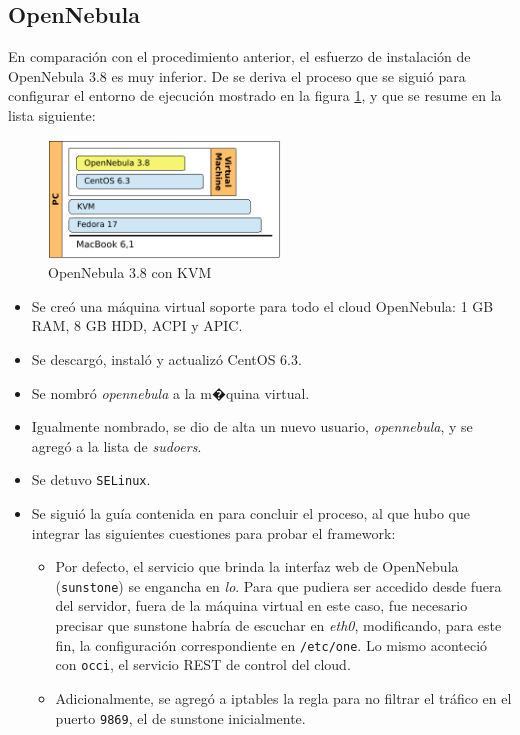 \subsection{OpenNebula}\label{subsec:opennebula}
\noindent En comparaci\'on con el procedimiento anterior, el esfuerzo de instalaci\'on de OpenNebula 3.8 es muy inferior. De \cite{centosonquickstart} se deriva el proceso que se sigui\'o para configurar el entorno de ejecuci\'on mostrado en la figura \ref{fig:opennebula}, y que se resume en la lista siguiente:

\begin{figure}[tbp]
\begin{center}
\includegraphics[width=0.55\textwidth]{imagenes/009.pdf}
 \caption{OpenNebula 3.8 con KVM}
\label{fig:opennebula}
\end{center}
\end{figure}

\begin{itemize}
 \item Se cre\'o una m\'aquina virtual soporte para todo el cloud OpenNebula: 1 GB RAM, 8 GB HDD, ACPI y APIC.
 \item Se descarg\'o, instal\'o y actualiz\'o CentOS 6.3.
 \item Se nombr\'o \emph{opennebula} a la m�quina virtual.
 \item Igualmente nombrado, se dio de alta un nuevo usuario, \emph{opennebula}, y se agreg\'o a la lista de \emph{sudoers}.
 \item Se detuvo \texttt{SELinux}.
 \item Se sigui\'o la gu\'ia contenida en \cite{centosonquickstart} para concluir el proceso, al que hubo que integrar las siguientes cuestiones para probar el framework:
  \begin{itemize}
   \item Por defecto, el servicio que brinda la interfaz web de OpenNebula (\texttt{sunstone}) se engancha en \emph{lo}. Para que pudiera ser accedido desde fuera del servidor, fuera de la m\'aquina virtual en este caso, fue necesario precisar que sunstone habr\'ia de escuchar en \emph{eth0}, modificando, para este fin, la configuraci\'on correspondiente en \texttt{/etc/one}. Lo mismo aconteci\'o con \texttt{occi}, el servicio REST de control del cloud.
   \item Adicionalmente, se agreg\'o a iptables la regla para no filtrar el tr\'afico en el puerto \texttt{9869}, el de sunstone inicialmente.
  \end{itemize}
\end{itemize}


